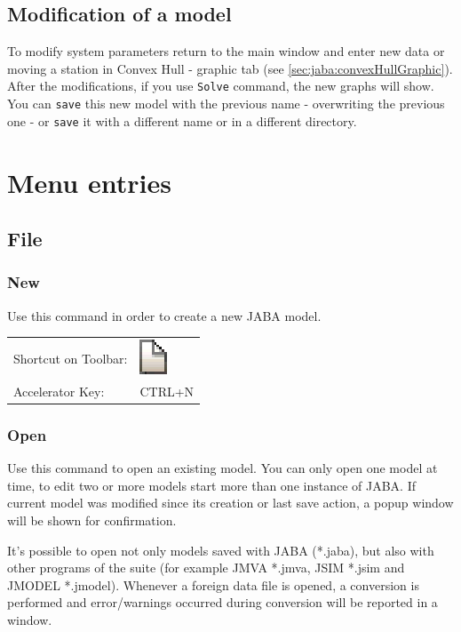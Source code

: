 \subsection{Modification of a model}
To modify system parameters return to the main window and enter new
data or moving a station in Convex Hull - graphic tab (see \autoref{sec:jaba:convexHullGraphic}).
After the modifications, if you use \texttt{Solve} command, the
new graphs will show. You can \texttt{save} this
new model with the previous name - overwriting the previous one - or
\texttt{save} it with a different name or in a different directory.

\section{Menu entries}
\label{sec:jaba:Menu}
\subsection{File}
\subsubsection{New}
Use this command in order to create a new JABA model.

\noindent
\begin{tabular}{ll}
Shortcut on Toolbar: & \includegraphics[scale=.8]{img/jaba/new}\\
Accelerator Key: & CTRL+N
\end{tabular}

\subsubsection{Open}
Use this command to open an existing model. You can only open one
model at time, to edit two or more models start more than one
instance of JABA. If current model was modified since its creation
or last save action, a popup window will be shown for confirmation.

It's possible to open not only models saved with JABA (*.jaba), but
also with other programs of the suite (for example JMVA *.jmva, JSIM
*.jsim and JMODEL *.jmodel). Whenever a foreign data file is opened, a
conversion is performed and error/warnings occurred during
conversion will be reported in a window.

